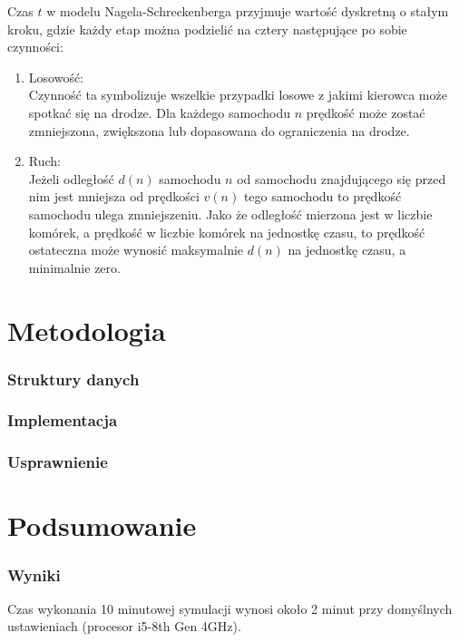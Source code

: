 \documentclass[a4paper,12pt]{article}
\begin{document}
	Czas $t$ w modelu Nagela-Schreckenberga przyjmuje wartość dyskretną o stałym kroku, gdzie każdy etap można podzielić na cztery następujące po sobie czynności:

	\begin{enumerate}
		\item Losowość: \\
		Czynność ta symbolizuje wszelkie przypadki losowe z jakimi kierowca może spotkać się na drodze. Dla każdego samochodu $n$ prędkość może zostać zmniejszona, zwiększona lub dopasowana do ograniczenia na drodze.
		\item Ruch: \\
		Jeżeli odległość $d(n)$ samochodu $n$ od samochodu znajdującego się przed nim jest mniejsza od prędkości $v(n)$ tego samochodu to prędkość samochodu ulega zmniejszeniu. Jako że odległość mierzona jest w liczbie komórek, a prędkość w liczbie komórek na jednostkę czasu, to prędkość ostateczna może wynosić maksymalnie $d(n)$ na jednostkę czasu, a minimalnie zero.
	\end{enumerate}

    \part{Metodologia}

    \section{Struktury danych}

    \section{Implementacja}

    \section{Usprawnienie}

    \part{Podsumowanie}

    \section{Wyniki}
    Czas wykonania 10 minutowej symulacji wynosi około 2 minut przy domyślnych ustawieniach (procesor i5-8th Gen 4GHz).
    
\end{document}
